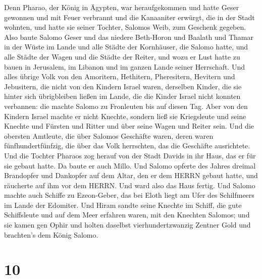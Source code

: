  Denn Pharao, der König in Ägypten, war heraufgekommen und
hatte Geser gewonnen und mit Feuer verbrannt und die Kanaaniter erwürgt,
die in der Stadt wohnten, und hatte sie seiner Tochter, Salomos Weib,
zum Geschenk gegeben.  Also baute Salomo Geser und das
niedere Beth-Horon  und Baalath und Thamar in der Wüste im
Lande  und alle Städte der Kornhäuser, die Salomo hatte,
und alle Städte der Wagen und die Städte der Reiter, und wozu er Lust
hatte zu bauen in Jerusalem, im Libanon und im ganzen Lande seiner
Herrschaft.  Und alles übrige Volk von den Amoritern,
Hethitern, Pheresitern, Hevitern und Jebusitern, die nicht von den
Kindern Israel waren,  derselben Kinder, die sie hinter
sich übrigbleiben ließen im Lande, die die Kinder Israel nicht konnten
verbannen: die machte Salomo zu Fronleuten bis auf diesen Tag.
 Aber von den Kindern Israel machte er nicht Knechte,
sondern ließ sie Kriegsleute und seine Knechte und Fürsten und Ritter
und über seine Wagen und Reiter sein.  Und die obersten
Amtleute, die über Salomos Geschäfte waren, deren waren
fünfhundertfünfzig, die über das Volk herrschten, das die Geschäfte
ausrichtete.  Und die Tochter Pharaos zog herauf von der
Stadt Davids in ihr Haus, das er für sie gebaut hatte. Da baute er auch
Millo.  Und Salomo opferte des Jahres dreimal Brandopfer
und Dankopfer auf dem Altar, den er dem HERRN gebaut hatte, und
räucherte auf ihm vor dem HERRN. Und ward also das Haus fertig.
 Und Salomo machte auch Schiffe zu Ezeon-Geber, das bei
Eloth liegt am Ufer des Schilfmeers im Lande der Edomiter. 
Und Hiram sandte seine Knechte im Schiff, die gute Schiffsleute und auf
dem Meer erfahren waren, mit den Knechten Salomos;  und sie
kamen gen Ophir und holten daselbst vierhundertzwanzig Zentner Gold und
brachten's dem König Salomo.

\hypertarget{section-9}{%
\section{10}\label{section-9}}

